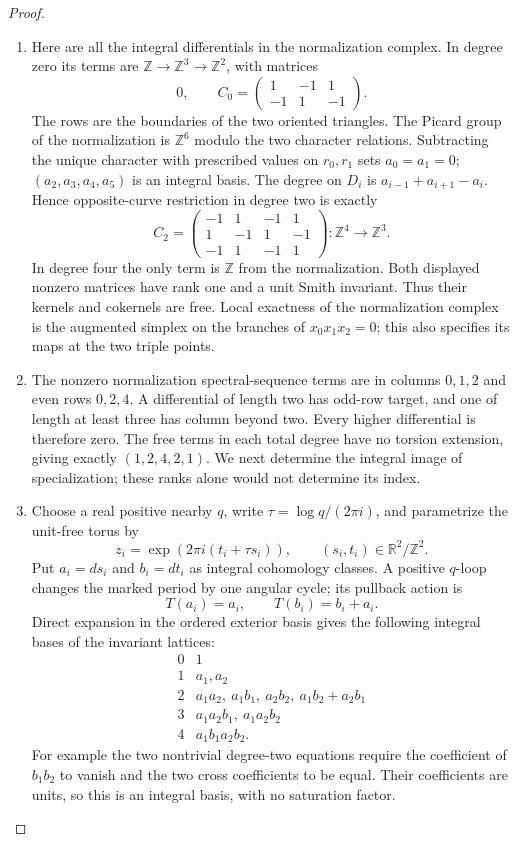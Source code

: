 \begin{proof}
\begin{enumerate}[label=\arabic*.]
\item Here are all the integral differentials in the normalization
complex.  In degree zero its terms are
\(\mathbb Z\to\mathbb Z^3\to\mathbb Z^2\), with matrices
\[
 0,\qquad
 C_0=\begin{pmatrix}1&-1&1\\-1&1&-1\end{pmatrix}.
\]
The rows are the boundaries of the two oriented triangles.
The Picard group of the normalization is \(\mathbb Z^6\) modulo
the two character relations.  Subtracting the unique character
with prescribed values on \(r_0,r_1\) sets \(a_0=a_1=0\);
\((a_2,a_3,a_4,a_5)\) is an integral basis.  The degree on
\(D_i\) is \(a_{i-1}+a_{i+1}-a_i\).  Hence opposite-curve
restriction in degree two is exactly
\[
 C_2=\begin{pmatrix}
 -1&1&-1&1\\
  1&-1&1&-1\\
 -1&1&-1&1
 \end{pmatrix}:\mathbb Z^4\longrightarrow\mathbb Z^3.
\]
In degree four the only term is \(\mathbb Z\) from the
normalization.  Both displayed nonzero matrices have rank one
and a unit Smith invariant.  Thus their kernels and cokernels
are free.  Local exactness of the normalization complex is the
augmented simplex on the branches of \(x_0x_1x_2=0\); this also
specifies its maps at the two triple points.

\item The nonzero normalization spectral-sequence terms are in
columns \(0,1,2\) and even rows \(0,2,4\).  A differential of
length two has odd-row target, and one of length at least three
has column beyond two.  Every higher differential is therefore
zero.  The free terms in each total degree have no torsion
extension, giving exactly \((1,2,4,2,1)\).  We next determine the
integral image of specialization; these ranks alone would not
determine its index.

\item Choose a real positive nearby \(q\), write
\(\tau=\log q/(2\pi i)\), and parametrize the unit-free torus by
\[
 z_i=\exp(2\pi i(t_i+\tau s_i)),\qquad
 (s_i,t_i)\in\mathbb R^2/\mathbb Z^2.
\]
Put \(a_i=ds_i\) and \(b_i=dt_i\) as integral cohomology
classes.  A positive \(q\)-loop changes the marked period by one
angular cycle; its pullback action is
\[
                   T(a_i)=a_i,\qquad T(b_i)=b_i+a_i.
\]
Direct expansion in the ordered exterior basis gives the following
integral bases of the invariant lattices:
\[
\begin{array}{c|l}
0&1\\
1&a_1,a_2\\
2&a_1a_2,\ a_1b_1,\ a_2b_2,\ a_1b_2+a_2b_1\\
3&a_1a_2b_1,\ a_1a_2b_2\\
4&a_1b_1a_2b_2.
\end{array}
\]
For example the two nontrivial degree-two equations require the
coefficient of \(b_1b_2\) to vanish and the two cross coefficients
to be equal.  Their coefficients are units, so this is an integral
basis, with no saturation factor.


\end{enumerate}
\end{proof}
